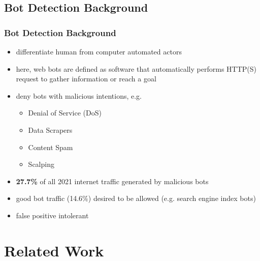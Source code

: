 \documentclass[t,aspectratio=169,table]{beamer}
\begin{document}
\subsection{Bot Detection Background}
\begin{frame}
\frametitle{Bot Detection Background}

\begin{itemize}
    \item differentiate human from computer automated actors
    \item here, web bots are defined as software that automatically performs HTTP(S) request to gather information or reach a goal
    \item deny bots with malicious intentions, e.g.
    \begin{itemize}
        \item Denial of Service (DoS)
        \item Data Scrapers
        \item Content Spam
        \item Scalping
    \end{itemize}
    \item \textbf{27.7\%} of all 2021 internet traffic generated by malicious bots \cite{BAD_BOT_REPORT2022}
    \item good bot traffic (14.6\%) desired to be allowed (e.g. search engine index bots)
    \item false positive intolerant
\end{itemize}

\end{frame}

\section{Related Work}
\end{document}
